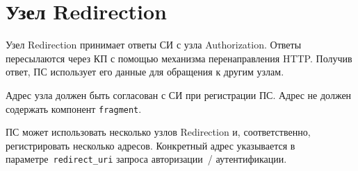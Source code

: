 \section{Узел Redirection}\label{OIDC.Redicrection}

Узел Redirection принимает ответы СИ с узла Authorization.
Ответы пересылаются через КП с помощью механизма перенаправления HTTP. 
Получив ответ, ПС использует его данные для обращения к другим узлам.

Адрес узла должен быть согласован с СИ при регистрации ПС.
%
%
Адрес не должен содержать компонент \lstinline{fragment}.

ПС может использовать несколько узлов Redirection и, соответственно,
регистрировать несколько адресов. Конкретный адрес указывается в 
параметре~\lstinline{redirect_uri} запроса авторизации~/ аутентификации.

